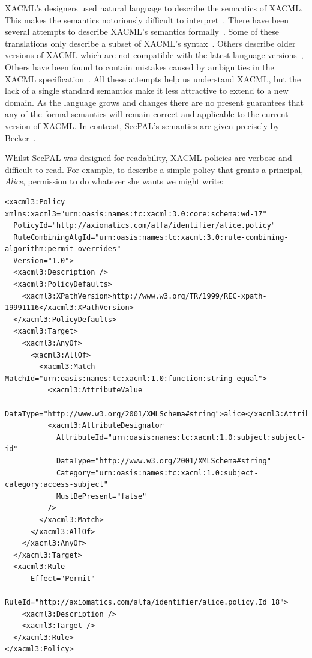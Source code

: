 \documentclass[thesis.tex]{subfiles}
\begin{document}
XACML's designers used natural language to describe the semantics of XACML. This
makes the semantics notoriously difficult to
interpret~\cite{ramli_detecting_2015}. There have been several attempts to
describe XACML's semantics
formally~\cite{ramli_xacml_2012,ramli_logic_2014,bryans_reasoning_2005}. Some of
these translations only describe a subset of XACML's
syntax~\cite{halpern_using_2008}. Others describe older versions of XACML which
are not compatible with the latest language versions~\cite{ahn_reasoning_2010},
Others have been found to contain mistakes caused by ambiguities in the
XACML specification~\cite{bruns_access-control_2008,halpern_using_2008}. All
these attempts help us understand XACML, but the lack of a single standard
semantics make it less attractive to extend to a new domain. As the language
grows and changes there are no present guarantees that any of the formal
semantics will remain correct and applicable to the current version of XACML. In
contrast, SecPAL's semantics are given precisely by
Becker~\cite{becker_secpal:_2006}.

Whilst SecPAL was designed for readability, XACML policies are verbose and
difficult to read. For example, to describe a simple policy that grants a principal,
\emph{Alice}, permission to do whatever she wants we might write:

\noindent\begin{minipage}{\linewidth}
\begin{lstlisting}
<xacml3:Policy xmlns:xacml3="urn:oasis:names:tc:xacml:3.0:core:schema:wd-17"
  PolicyId="http://axiomatics.com/alfa/identifier/alice.policy"
  RuleCombiningAlgId="urn:oasis:names:tc:xacml:3.0:rule-combining-algorithm:permit-overrides"
  Version="1.0">
  <xacml3:Description />
  <xacml3:PolicyDefaults>
    <xacml3:XPathVersion>http://www.w3.org/TR/1999/REC-xpath-19991116</xacml3:XPathVersion>
  </xacml3:PolicyDefaults>
  <xacml3:Target>
    <xacml3:AnyOf>
      <xacml3:AllOf>
        <xacml3:Match MatchId="urn:oasis:names:tc:xacml:1.0:function:string-equal">
          <xacml3:AttributeValue
            DataType="http://www.w3.org/2001/XMLSchema#string">alice</xacml3:AttributeValue>
          <xacml3:AttributeDesignator 
            AttributeId="urn:oasis:names:tc:xacml:1.0:subject:subject-id"
            DataType="http://www.w3.org/2001/XMLSchema#string"
            Category="urn:oasis:names:tc:xacml:1.0:subject-category:access-subject"
            MustBePresent="false"
          />
        </xacml3:Match>
      </xacml3:AllOf>
    </xacml3:AnyOf>
  </xacml3:Target>
  <xacml3:Rule 
      Effect="Permit"
      RuleId="http://axiomatics.com/alfa/identifier/alice.policy.Id_18">
    <xacml3:Description />
    <xacml3:Target />
  </xacml3:Rule>
</xacml3:Policy>
\end{lstlisting}
\end{minipage}
\end{document}
